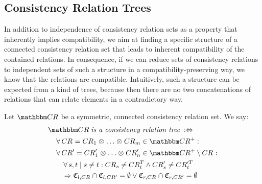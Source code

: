 \subsection{Consistency Relation Trees}

In addition to independence of consistency relation sets as a property that inherently implies compatibility, we aim at finding a specific structure of a connected consistency relation set that leads to inherent compatibility of the contained relations.
In consequence, if we can reduce sets of consistency relations to independent sets of such a structure in a compatibility-preserving way, we know that the relations are compatible.
Intuitively, such a structure can be expected from a kind of trees, because then there are no two concatenations of relations that can relate elements in a contradictory way.

\begin{definition} \label{def:relationtree}
    Let $\consistencyrelationset{CR}$ be a symmetric, connected consistency relation set. 
    We say:
    \begin{align*}
        &
        \consistencyrelationset{CR} \mathtextspacearound{is a consistency relation tree} \equivalentperdefinition \\
        & \formulaskip
        \forall \consistencyrelation{CR}{} = \consistencyrelation{CR}{1} \concat \dots \concat \consistencyrelation{CR}{m}  \in \transitiveclosure{\consistencyrelationset{CR}} : \\
        & \formulaskip
        \forall \consistencyrelation{CR}{}' = \consistencyrelation{CR}{1}' \concat \dots \concat \consistencyrelation{CR}{n}' \in \transitiveclosure{\consistencyrelationset{CR}} \setminus \consistencyrelation{CR}{} : \\
        & \formulaskip\formulaskip
        \forall s, t \mid s \neq t: 
        \consistencyrelation{CR}{s} \neq \consistencyrelation{CR}{t}^T \land \consistencyrelation{CR}{s}' \neq \consistencyrelation{CR}{t}'^T \\
        & \formulaskip\formulaskip
        \Rightarrow
        \classtuple{C}{l,\consistencyrelation{CR}{}} \cap
        \classtuple{C}{l,\consistencyrelation{CR}{}'} = \emptyset
        \lor \classtuple{C}{r,\consistencyrelation{CR}{}} \cap
        \classtuple{C}{r,\consistencyrelation{CR}{}'} = \emptyset
    \end{align*}
\end{definition}

